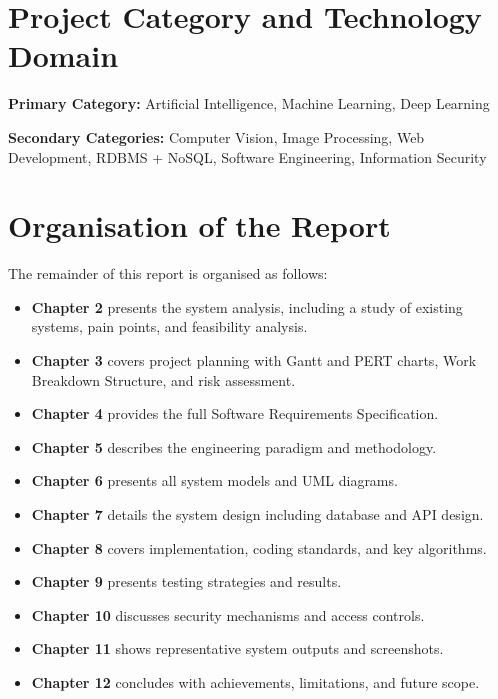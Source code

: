 \documentclass[12pt,a4paper]{report}
\begin{document}
\section{Project Category and Technology Domain}

\textbf{Primary Category:} Artificial Intelligence, Machine Learning, Deep Learning

\textbf{Secondary Categories:} Computer Vision, Image Processing, Web Development, RDBMS + NoSQL, Software Engineering, Information Security

\section{Organisation of the Report}

The remainder of this report is organised as follows:

\begin{itemize}
    \item \textbf{Chapter 2} presents the system analysis, including a study of existing systems, pain points, and feasibility analysis.
    \item \textbf{Chapter 3} covers project planning with Gantt and PERT charts, Work Breakdown Structure, and risk assessment.
    \item \textbf{Chapter 4} provides the full Software Requirements Specification.
    \item \textbf{Chapter 5} describes the engineering paradigm and methodology.
    \item \textbf{Chapter 6} presents all system models and UML diagrams.
    \item \textbf{Chapter 7} details the system design including database and API design.
    \item \textbf{Chapter 8} covers implementation, coding standards, and key algorithms.
    \item \textbf{Chapter 9} presents testing strategies and results.
    \item \textbf{Chapter 10} discusses security mechanisms and access controls.
    \item \textbf{Chapter 11} shows representative system outputs and screenshots.
    \item \textbf{Chapter 12} concludes with achievements, limitations, and future scope.
\end{itemize}

\end{document}
